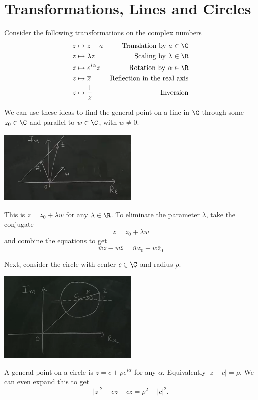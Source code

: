 \documentclass[a4]{scrreprt}
\begin{document}
\section{Transformations, Lines and Circles}

Consider the following transformations on the complex numbers
\begin{align*}
	z &\mapsto z + a & \text{Translation by }a \in \C \\
	z &\mapsto \lambda z & \text{Scaling by }\lambda \in \R\\
	z &\mapsto e^{i \alpha} z & \text{Rotation by } \alpha \in \R \\
	z &\mapsto \overline{z} & \text{Reflection in the real axis} \\
	z &\mapsto \frac{1}{z} & \text{Inversion} 
\end{align*}

We can use these ideas to find the general point on a line in $\C$ through some $z_0 \in \C$ and parallel to $w \in \C$, with $w \neq 0$.
\begin{center}
	\includegraphics[width=0.5\textwidth]{general_points.png}
\end{center}
This is $z = z_0 + \lambda w$ for any $\lambda \in \R$. To eliminate the parameter $\lambda$, take the conjugate
$$
\overline{z} = \overline{z_0} + \lambda \overline{w}
$$
and combine the equations to get
$$
\overline{w} z-w \overline{z}=\overline{w} z_{0}-w \overline{z}_{0}
$$

Next, consider the circle with center $c \in \C$ and radius $\rho$.
\begin{center}
	\includegraphics[width=0.5\textwidth]{general_circle.png}
\end{center}
A general point on a circle is $z = c + \rho e^{i \alpha}$ for any $\alpha$.
Equivalently $|z - c| = \rho$. We can even expand this to get
$$
|z|^2 - \overline{c} z - c\overline{z} = \rho^2 - |c|^2.
$$
\end{document}
